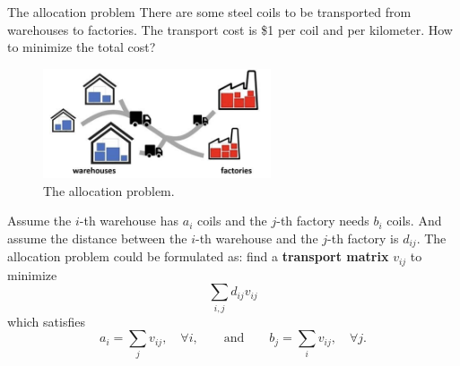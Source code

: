\begin{frame}{The allocation problem}
    \footnotesize
    There are some steel coils to be transported from warehouses to factories.
    The transport cost is \$1 per coil and per kilometer.
    How to minimize the total cost?

    \begin{figure}
        \captionsetup{font=scriptsize}
        \centering
        \includegraphics[width=0.6\textwidth]{png/SteelTransport.jpg}
        \caption{The allocation problem.}
    \end{figure}

    \pause\vspace{-.5em}
    Assume the $i$-th warehouse has $a_i$ coils and the $j$-th factory
    needs $b_i$ coils. And assume the distance between the $i$-th warehouse
    and the $j$-th factory is $d_{ij}$. The allocation problem could be 
    formulated as: find a \textbf{transport matrix} $v_{ij}$ to minimize
    \begin{equation}
        \sum_{i,j} d_{ij}v_{ij}
    \end{equation}
    which satisfies
    \begin{equation}
        a_i=\sum_{j} v_{ij},\quad \forall i,
        \qquad \text{and} \qquad 
        b_j=\sum_{i} v_{ij},\quad \forall j.
    \end{equation}
\end{frame}

